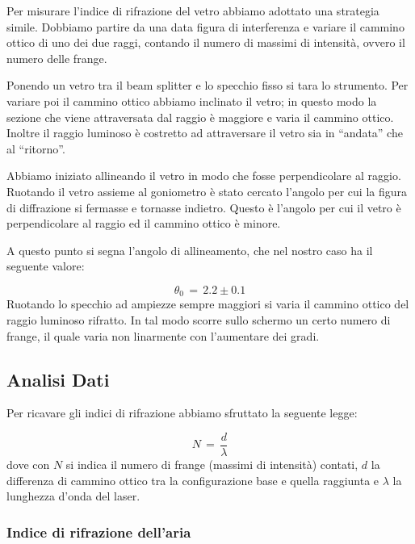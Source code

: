 Per misurare l'indice di rifrazione del vetro abbiamo adottato una strategia simile. Dobbiamo partire da una data figura di interferenza e variare il cammino ottico di uno dei due raggi, contando il numero di massimi di intensità, ovvero il numero delle frange.

Ponendo un vetro tra il beam splitter e lo specchio fisso si tara lo strumento. Per variare poi il cammino ottico abbiamo
inclinato il vetro; in questo modo la sezione che viene attraversata dal raggio è maggiore e varia il cammino ottico.
Inoltre il raggio luminoso è costretto ad attraversare il vetro sia in ``andata'' che al ``ritorno''.

Abbiamo iniziato allineando il vetro in modo che fosse perpendicolare al raggio. Ruotando il vetro assieme al goniometro è stato cercato l'angolo per cui la figura di diffrazione si fermasse e tornasse indietro.
Questo è l'angolo per cui il vetro è perpendicolare al raggio ed il cammino ottico è minore.

A questo punto si segna l'angolo di allineamento, che nel nostro caso ha il seguente valore:

\begin{equation}
	\theta_0 \,=\, 2.2 \pm 0.1
\end{equation}
%
Ruotando lo specchio ad ampiezze sempre maggiori si varia il cammino ottico del raggio luminoso rifratto.
In tal modo scorre sullo schermo un certo numero di frange, il quale varia non linarmente con l'aumentare dei gradi.

\subsection{Analisi Dati}

Per ricavare gli indici di rifrazione abbiamo sfruttato la seguente legge:

\begin{equation}
	N \,=\, \frac{d}{\lambda}
\end{equation}
%
dove con $N$ si indica il numero di frange (massimi di intensità) contati, $d$ la differenza di cammino
ottico tra la configurazione base e quella raggiunta e $\lambda$ la lunghezza d'onda del laser.

\subsubsection{Indice di rifrazione dell'aria} %


